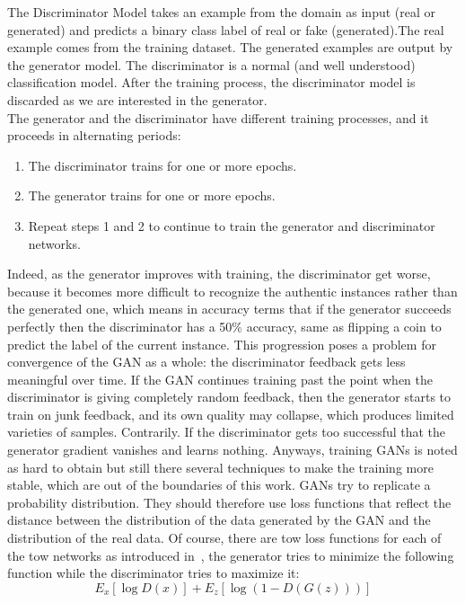 The Discriminator Model takes an example from the domain as input (real or generated) and predicts a binary class label of real or fake (generated).The real example comes from the training dataset. The generated examples are output by the generator model. The discriminator is a normal (and well understood) classification model. After the training process, the discriminator model is discarded as we are interested in the generator.\\
The generator and the discriminator have different training processes, and it proceeds in alternating periods:
\begin{enumerate}
	\item The discriminator trains for one or more epochs.
	\item The generator trains for one or more epochs.
	\item Repeat steps 1 and 2 to continue to train the generator and discriminator networks.
\end{enumerate}

Indeed, as the generator improves with training, the discriminator get worse, because it becomes more difficult to recognize the authentic instances rather than the generated one, which means in accuracy terms that if the generator succeeds perfectly then the discriminator has a 50\% accuracy, same as flipping a coin to predict the label of the current instance.
This progression poses a problem for convergence of the GAN as a whole: the discriminator feedback gets less meaningful over time. If the GAN continues training past the point when the discriminator is giving completely random feedback, then the generator starts to train on junk feedback, and its own quality may collapse, which produces limited varieties of samples. Contrarily. If the discriminator gets too successful that the generator gradient vanishes and learns nothing.
Anyways, training GANs is noted as hard to obtain but still there several techniques to make the training more stable, which are out of the boundaries of this work. GANs try to replicate a probability distribution. They should therefore use loss functions that reflect the distance between the distribution of the data generated by the GAN and the distribution of the real data. Of course, there are tow loss functions for each of the tow networks as introduced in~\cite{goodfellow2014generative}, the generator tries to minimize the following function while the discriminator tries to maximize it:
\begin{equation}
E_x[\log{D(x)}] + E_z[\log{(1-D(G(z)))}]
\label{eq:GAN_loss}
\end{equation}

